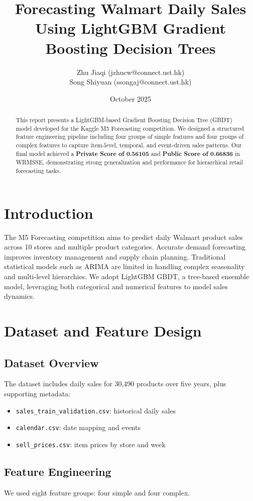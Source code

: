 \documentclass[12pt,a4paper]{article}
\title{\textbf{Forecasting Walmart Daily Sales Using LightGBM Gradient Boosting Decision Trees}}
\author{
  Zhu Jiaqi (jzhucw@connect.ust.hk) \\
  Song Shiyuan (ssongaj@connect.ust.hk)
}
\date{October 2025}
\begin{document}
\maketitle

\begin{abstract}
This report presents a LightGBM-based Gradient Boosting Decision Tree (GBDT) model developed for the Kaggle M5 Forecasting competition. 
We designed a structured feature engineering pipeline including four groups of simple features and four groups of complex features to capture item-level, temporal, and event-driven sales patterns. 
Our final model achieved a \textbf{Private Score of 0.56105} and \textbf{Public Score of 0.66836} in WRMSSE, 
demonstrating strong generalization and performance for hierarchical retail forecasting tasks.
\end{abstract}

\section{Introduction}
The M5 Forecasting competition aims to predict daily Walmart product sales across 10 stores and multiple product categories. 
Accurate demand forecasting improves inventory management and supply chain planning. 
Traditional statistical models such as ARIMA are limited in handling complex seasonality and multi-level hierarchies. 
We adopt LightGBM GBDT, a tree-based ensemble model, leveraging both categorical and numerical features to model sales dynamics.

\section{Dataset and Feature Design}
\subsection{Dataset Overview}
The dataset includes daily sales for 30,490 products over five years, plus supporting metadata:
\begin{itemize}
  \item \texttt{sales\_train\_validation.csv}: historical daily sales
  \item \texttt{calendar.csv}: date mapping and events
  \item \texttt{sell\_prices.csv}: item prices by store and week
\end{itemize}

\subsection{Feature Engineering}
We used eight feature groups: four simple and four complex.
\end{document}
